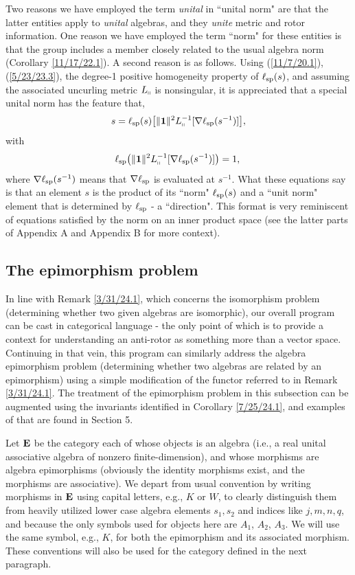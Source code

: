 \documentclass{amsart}
\numberwithin{equation}{section}
\theoremstyle{definition}
\numberwithin{theorem}{section}
\begin{document}
Two reasons we have employed the term {\it unital} in ``unital norm" are that the latter entities apply to {\it unital} algebras, and they {\it unite} metric and rotor information.  One reason we have employed the term ``norm" for these entities is that the group includes a member closely related to the usual algebra norm (Corollary \ref{11/17/22.1}).  A second reason is as follows.   Using (\ref{11/7/20.1}), (\ref{5/23/23.3}), the degree-1 positive homogeneity property of $\ell_{\rm sp}(s)$, and assuming the associated uncurling metric $L_{\shortparallel}$ is nonsingular, it is appreciated that a special unital norm has the feature that, 
\begin{equation}\label{5/22/24.5}  s = \ell_{\rm sp}(s)\big[\|\mathbf{1}\|^2 L_{\shortparallel}^{-1}[\nabla\ell_{\rm sp}(s^{-1})]\big],\end{equation} with
\begin{equation}\label{5/22/24.6}\ell_{\rm sp}\big(\|\mathbf{1}\|^2 L_{\shortparallel}^{-1}[\nabla\ell_{\rm sp}(s^{-1})]\big) = 1,\,\end{equation}
where $\nabla\ell_{\rm sp}(s^{-1})$ means that $\nabla\ell_{\rm sp}$ is evaluated at $s^{-1}$.  What these equations say is that an element $s$ is the product of its ``norm" $\ell_{\rm sp}(s)$ and a ``unit norm" element that is determined by $\ell_{\rm sp}$ - a ``direction".  This format is very reminiscent of equations satisfied by the norm on an inner product space (see the latter parts of Appendix A and Appendix B for more context).

\subsection{The epimorphism problem}
 In line with Remark \ref{3/31/24.1}, which concerns the isomorphism problem (determining whether two given algebras are isomorphic), our overall program can be cast in categorical language - the only point of which is to provide a context for understanding an anti-rotor as something more than a vector space. 
Continuing in that vein, this program can similarly address the algebra epimorphism problem (determining whether two algebras are related by an epimorphism) using a simple modification of the functor referred to in Remark \ref{3/31/24.1}.  The treatment of the epimorphism problem in this subsection can be augmented using the invariants identified in Corollary \ref{7/25/24.1}, and examples of that are found in Section 5.  

Let ${\bf E}$ be the category each of whose objects is an algebra (i.e., a real unital associative algebra of nonzero finite-dimension), and whose morphisms are algebra epimorphisms (obviously the identity morphisms exist, and the morphisms are associative).   We depart from usual convention by writing morphisms in ${\bf E}$ using capital letters, e.g., $K$ or $W$, to clearly distinguish them from heavily utilized lower case algebra elements $s_1,s_2$ and indices like $j,m,n,q$, and because the only symbols used for objects here are $A_1$, $A_2$, $A_3$. We will use the same symbol, e.g., $K$, for both the epimorphism and its associated morphism. These conventions will also be used for the category defined in the next paragraph.   
\end{document}
